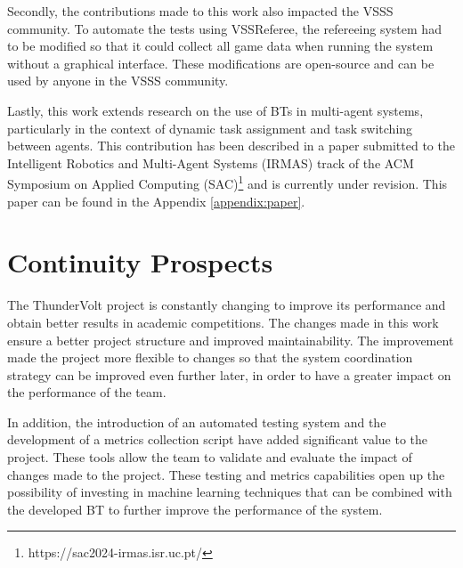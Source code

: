 Secondly, the contributions made to this work also impacted the VSSS community. To automate the tests using VSSReferee, the refereeing system had to be modified so that it could collect all game data when running the system without a graphical interface. These modifications are open-source and can be used by anyone in the VSSS community.

Lastly, this work extends research on the use of BTs in multi-agent systems, particularly in the context of dynamic task assignment and task switching between agents. This contribution has been described in a paper submitted to the Intelligent Robotics and Multi-Agent Systems (IRMAS) track of the ACM Symposium on Applied Computing (SAC)\footnote{https://sac2024-irmas.isr.uc.pt/} and is currently under revision. This paper can be found in the Appendix \ref{appendix:paper}.

\section{Continuity Prospects}

The ThunderVolt project is constantly changing to improve its performance and obtain better results in academic competitions. The changes made in this work ensure a better project structure and improved maintainability. The improvement made the project more flexible to changes so that the system coordination strategy can be improved even further later, in order to have a greater impact on the performance of the team.

In addition, the introduction of an automated testing system and the development of a metrics collection script have added significant value to the project. These tools allow the team to validate and evaluate the impact of changes made to the project. These testing and metrics capabilities open up the possibility of investing in machine learning techniques that can be combined with the developed BT to further improve the performance of the system.
